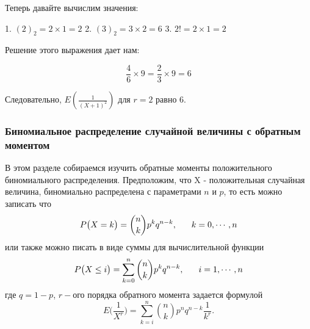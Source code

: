 \documentclass[13pt]{article}
\begin{document}
Теперь давайте вычислим значения:

1. \((2)_2 = 2 \times 1 = 2\) 
2. \((3)_2 = 3 \times 2 = 6\)
3. \(2! = 2 \times 1 = 2\)


Решение этого выражения дает нам:

\[ \frac{4}{6} \times 9 = \frac{2}{3} \times 9 = 6 \]

Следовательно, \(E\left(\frac{1}{(X+1)^2}\right)\) для \(r=2\) равно 6.
\subsubsection{Биномиальное распределение случайной величины с обратным моментом}\label{subsection 2.2}
В этом разделе собираемся изучить обратные моменты положительного биномиального распределения. Предположим, что X - положительная случайная величина, биномиально распределена с параметрами $n$ и $p$, то есть можно записать что 
\begin{equation}\label{eq:(10)}
    P\big(X=k\big) = \binom{n}{k} p^{k} q^{n-k}, \hspace{6 mm} k=0,\cdots,n
\end{equation}
или также можно писать в виде суммы для вычислительной функции
\begin{equation*}\label{eq:(11)}
    P\big(X \le i\big) = \sum_{k=0}^{n} \binom{n}{k} p^{k} q^{n-k}, \hspace{6 mm} i=1,\cdots, n
\end{equation*}
где $q=1-p$, $r-$ого порядка обратного момента задается формулой
\begin{equation}\label{eq:(12)}
   E\bigg(\frac{1}{X^{r}}\bigg) =  \sum_{k=i}^{n} \binom{n}{k} p^{n}q^{n-k} \frac{1}{k^r}.
\end{equation}
\end{document}
